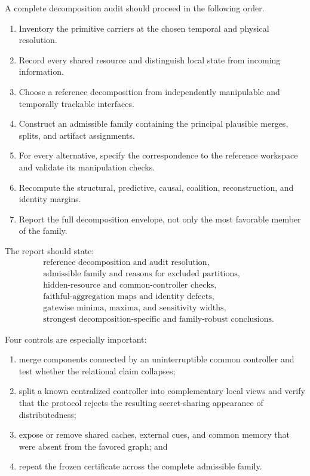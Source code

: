 \documentclass[11pt,letterpaper]{article}
\theoremstyle{plain}
\theoremstyle{definition}
\begin{document}
A complete decomposition audit should proceed in the following order.
\begin{enumerate}
\item Inventory the primitive carriers at the chosen temporal and physical
 resolution.
\item Record every shared resource and distinguish local state from incoming
 information.
\item Choose a reference decomposition from independently manipulable and
 temporally trackable interfaces.
\item Construct an admissible family containing the principal plausible
 merges, splits, and artifact assignments.
\item For every alternative, specify the correspondence to the reference
 workspace and validate its manipulation checks.
\item Recompute the structural, predictive, causal, coalition, reconstruction,
 and identity margins.
\item Report the full decomposition envelope, not only the most favorable
 member of the family.
\end{enumerate}

The report should state:
\[
\begin{aligned}
&\text{reference decomposition and audit resolution},\\
&\text{admissible family and reasons for excluded partitions},\\
&\text{hidden-resource and common-controller checks},\\
&\text{faithful-aggregation maps and identity defects},\\
&\text{gatewise minima, maxima, and sensitivity widths},\\
&\text{strongest decomposition-specific and family-robust conclusions}.
\end{aligned}
\]

Four controls are especially important:
\begin{enumerate}
\item merge components connected by an uninterruptible common controller and
 test whether the relational claim collapses;
\item split a known centralized controller into complementary local views and
 verify that the protocol rejects the resulting secret-sharing appearance of
 distributedness;
\item expose or remove shared caches, external cues, and common memory that
 were absent from the favored graph; and
\item repeat the frozen certificate across the complete admissible family.
\end{enumerate}
\end{document}
